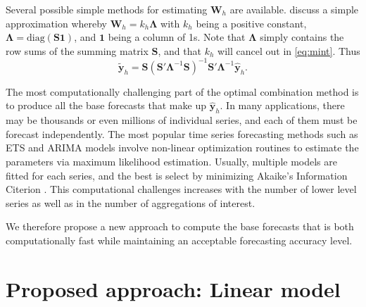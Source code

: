 \documentclass[11pt,a4paper,]{article}
\begin{document}
Several possible simple methods for estimating \(\bm{W}_h\) are
available. \textcite{mint2018} discuss a simple approximation whereby
\(\bm{W}_h = k_h \bm{\Lambda}\) with \(k_h\) being a positive constant,
\(\bm{\Lambda} = \text{diag}(\bm{S}\bm{1})\), and \(\bm{1}\) being a
column of 1s. Note that \(\bm{\Lambda}\) simply contains the row sums of
the summing matrix \(\bm{S}\), and that \(k_h\) will cancel out in
\eqref{eq:mint}. Thus \begin{equation}\label{eq:mint2}
  \tilde{\bm{y}}_{h}=\bm{S}(\bm{S}'\bm{\Lambda}^{-1}\bm{S})^{-1}\bm{S}'\bm{\Lambda}^{-1}\hat{\bm{y}}_h.
\end{equation}

The most computationally challenging part of the optimal combination
method is to produce all the base forecasts that make up
\(\hat{\bm{y}}_h\). In many applications, there may be thousands or even
millions of individual series, and each of them must be forecast
independently. The most popular time series forecasting methods such as
ETS and ARIMA models \autocite{fpp2} involve non-linear optimization
routines to estimate the parameters via maximum likelihood estimation.
Usually, multiple models are fitted for each series, and the best is
select by minimizing Akaike's Information Citerion
\autocite{akaike1998information}. This computational challenges
increases with the number of lower level series as well as in the number
of aggregations of interest.

We therefore propose a new approach to compute the base forecasts that
is both computationally fast while maintaining an acceptable forecasting
accuracy level.

\hypertarget{proposed-approach-linear-model}{%
\section{\texorpdfstring{Proposed approach: Linear model
\label{sec:proposedapproach1}}{Proposed approach: Linear model }}\label{proposed-approach-linear-model}}
\end{document}
